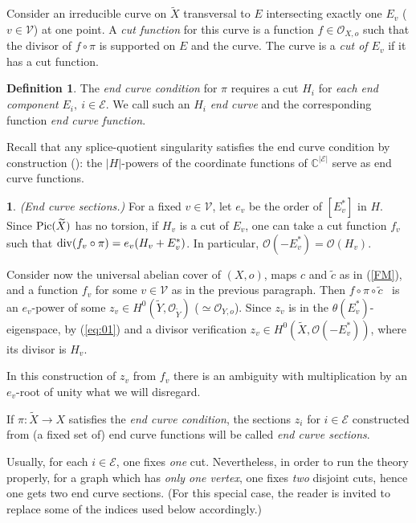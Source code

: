 \documentclass[10pt,a4paper]{amsart}
\numberwithin{equation}{section}
\numberwithin{equation}{subsection}
\theoremstyle{plain}
\theoremstyle{definition}
\newtheorem{definition}[equation]{Definition}
\newtheorem{bekezd}[equation]{}
\begin{document}
  Consider an irreducible curve on $\widetilde{X}$ transversal to $E$
  intersecting exactly one $E_v$  ($v\in{\mathcal{V}}$) at one point.
  A \emph{cut function} for this curve is a function $f\in {\mathcal{O}}_{X,o}$ such that the
  divisor of $f\circ \pi$  is supported on $E$ and the curve.
  The curve is a \emph{cut of $E_v$} if it has a cut function.
\begin{definition}\label{def:31}\cite{NWuj2}
  The \emph{end curve condition} for $\pi$  requires a cut $H_i$
  for {\em each end component} $E_i,\ i\in{\mathcal{E}}$. We call such an $H_i$ {\em end curve} and the
corresponding function {\em end curve function}.
\end{definition}

 Recall that any splice-quotient singularity satisfies
the end curve condition by construction (\cite[(7.2)(6)]{NWuj2}):
the $|H|$-powers of the coordinate functions of ${\mathbb{C}}^{|{\mathcal{E}}|}$
serve as end curve functions.

\begin{bekezd}\label{rem:31}{\em (End curve sections.)} \cite{NWuj2} For a fixed
$v\in{\mathcal{V}}$, let $e_v$ be the order of $[E^*_v]$ in $H$. Since ${\rm
Pic}(\widetilde{X})$ has no torsion, if $H_v$ is a cut of $E_v$,
one can take a cut function  $f_v$ such that ${\rm div}(f_v\circ
\pi)=e_v(H_v+E^*_v)$. In particular, ${\mathcal{O}}(-E^*_v)={\mathcal{O}}(H_v)$.
\end{bekezd}
Consider now the universal abelian cover of $(X,o)$,  maps $c$ and
$\widetilde{c}$ as in (\ref{FM}), and  a function $f_v$ for some
$v\in {\mathcal{V}}$ as in the previous paragraph. Then $f\circ \pi\circ
\widetilde{c}$ \, is an $e_v$-power of some $z_v\in
H^0(\widetilde{Y},{\mathcal{O}}_{\widetilde{Y}})$ ($\simeq{\mathcal{O}}_{Y,o}$). Since
$z_v$ is in the $\theta(E^*_v)$-eigenspace, by (\ref{eq:01}) and a
divisor verification  $z_v\in H^0(\widetilde{X}, {\mathcal{O}}(-E^*_v))$,
where its divisor is $H_v$.

In this construction of $z_v$ from $f_v$ there is an ambiguity
with multiplication by an $e_v$-root of unity what we will
disregard.

If $\pi:\widetilde{X}\to X$  satisfies the {\em end curve
condition}, the sections  $z_i$ for $i\in {\mathcal{E}}$ constructed from (a
fixed set of) end curve functions will be  called {\em end curve
sections}.

Usually, for each $i\in {\mathcal{E}}$, one fixes {\em one} cut.
Nevertheless, in order to run the theory properly, for a graph
which has {\em only one vertex}, one fixes {\em two} disjoint
cuts, hence one gets two end curve sections. (For this special
case, the reader is invited to replace some of the indices used
below accordingly.)
\end{document}
